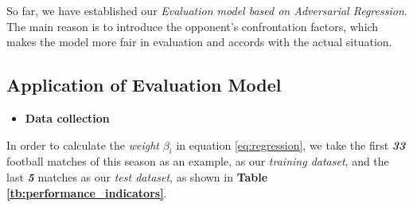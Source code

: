 \documentclass[12pt]{article}  %
\begin{document}
So far, we have established our \textit{Evaluation model based on Adversarial Regression}. The main reason is to introduce the opponent's confrontation factors, which makes the model more fair in evaluation and accords with the actual situation.

\subsection{Application of Evaluation Model}
\begin{itemize}
    \item \textbf{Data collection}
\end{itemize} 

In order to calculate the \textit{weight} $\beta_i$ in equation \eqref{eq:regression}, we take the first \textbf{\textit{33}} football matches of this season as an example, as our \textit{training dataset}, and the last \textbf{\textit{5}} matches as our \textit{test dataset}, as shown in \textbf{Table \ref{tb:performance_indicators}}.
\end{document}
